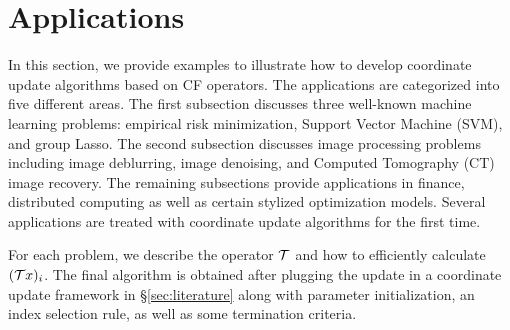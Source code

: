 \section{Applications}\label{sec:applications}
In this section, we provide examples to illustrate how to develop coordinate update algorithms based on CF operators. The applications are categorized into five different areas. The first subsection discusses three well-known machine learning problems: empirical risk minimization, Support Vector Machine (SVM), and group Lasso. The second subsection  discusses image processing problems including image deblurring, image denoising, and  Computed Tomography (CT) image recovery. The remaining subsections provide applications in finance, distributed computing as well as certain stylized optimization models. Several applications are treated with coordinate update algorithms for the first time. 


For each problem, we describe the operator ${\mathcal{T}}$ and how to efficiently calculate $({\mathcal{T}} x)_i$. The final algorithm is obtained after plugging the update in a coordinate update framework in \S\ref{sec:literature} along with  parameter initialization, an index selection rule, as well as some termination criteria.

